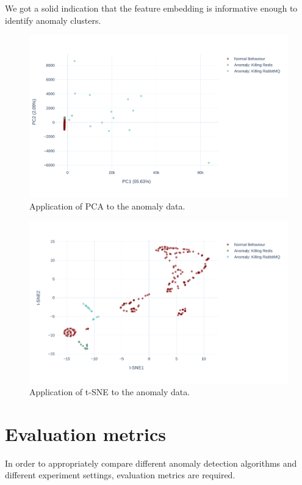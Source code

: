 We got a solid indication that the feature embedding is informative enough to identify anomaly clusters.

\begin{figure}[!h]
    \centering
    \includegraphics[width=\textwidth]{img/pca-anomalies-vs-normal.pdf}
    \caption{Application of PCA to the anomaly data.}
    \label{fig:pca-anomalies}
\end{figure}

\begin{figure}[!h]
    \centering
    \includegraphics[width=\textwidth]{img/tsne-anomalies-vs-normal.pdf}
    \caption{Application of t-SNE to the anomaly data.}
    \label{fig:tsne-anomalies}
\end{figure}

\section{Evaluation metrics}
\label{section:evaluationMetrics}
In order to appropriately compare different anomaly detection algorithms and different experiment settings, evaluation metrics are required.

